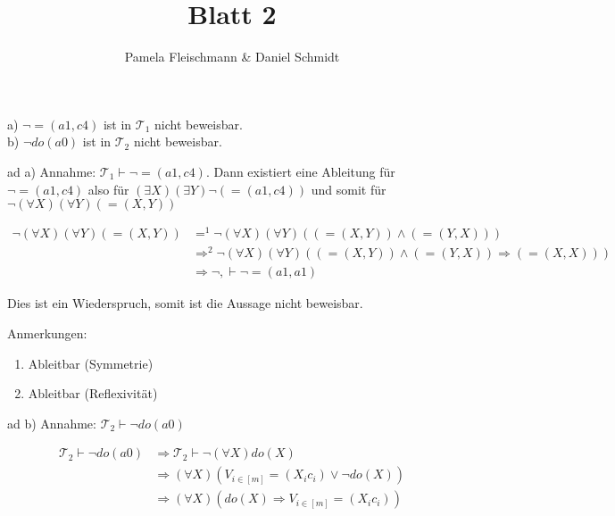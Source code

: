 \documentclass[12pt,a4paper]{amsart}
\begin{document}
\title{Blatt 2}

\author{Pamela Fleischmann \& Daniel Schmidt}

\maketitle

\begin{aufgabe1}
a) $\lnot =(a1,c4)$ ist in $\mathcal{T}_1$ nicht beweisbar.\\
b) $\lnot do(a0)$ ist in $\mathcal{T}_2$ nicht beweisbar.
\end{aufgabe1}

\medskip

ad a) Annahme: $\mathcal{T}_1 \vdash \lnot = (a1, c4)$. Dann existiert eine Ableitung für $\lnot = (a1, c4)$ also für $(\exists X)(\exists Y) \lnot(= (a1, c4))$ und somit für $\lnot (\forall X) (\forall Y)(= (X, Y))$

\begin{equation}
\begin{split}
\lnot (\forall X) (\forall Y)(= (X, Y)) &=^1 \lnot (\forall X) (\forall Y)((= (X, Y)) \wedge (= (Y, X)))\\
&\Rightarrow^2 \lnot (\forall X) (\forall Y) ((= (X, Y)) \wedge (= (Y, X)) \Rightarrow (= (X, X)))\\
&\Rightarrow \lnot, \vdash \lnot = (a1, a1)
\end{split}
\end{equation}

Dies ist ein Wiederspruch, somit ist die Aussage nicht beweisbar.

Anmerkungen:
\begin{enumerate}
\item Ableitbar (Symmetrie)
\item Ableitbar (Reflexivität)
\end{enumerate}

\medskip

ad b) Annahme: $\mathcal{T}_2 \vdash \lnot do(a0)$

\begin{equation}
\begin{split}
\mathcal{T}_2 \vdash \lnot do(a0) &\Rightarrow \mathcal{T}_2 \vdash \lnot (\forall X) do(X)\\
&\Rightarrow (\forall X) (V_{i \in [m]} = (X_i c_i) \vee \lnot do(X))\\
&\Rightarrow (\forall X) (do(X) \Rightarrow V_{i \in [m]} = (X_i c_i))
\end{split}
\end{equation}
\end{document}
